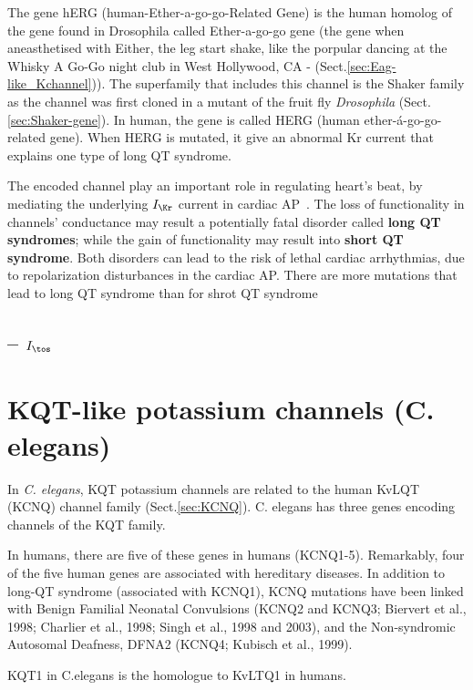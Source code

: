 The gene hERG (human-Ether-a-go-go-Related Gene) is the human homolog of the
gene found in Drosophila called Ether-a-go-go gene (the gene when aneasthetised
with Either, the leg start shake, like the porpular dancing at the Whisky A
Go-Go night club in West Hollywood, CA - (Sect.\ref{sec:Eag-like_Kchannel})).
The superfamily that includes this channel is the Shaker family as the
channel was first cloned in a mutant of the fruit fly {\it Drosophila}
(Sect.\ref{sec:Shaker-gene}). 
In human, the gene is called HERG (human ether-\'a-go-go-related gene). When
HERG is mutated, it give an abnormal Kr current that explains one type of
long QT syndrome.

The encoded channel play an important role in regulating heart's beat, by
mediating the underlying $I_\Kr$ current in cardiac
AP~\citep{mazhari2001,clancy2001,oehmen2002,fink2008}. The loss of functionality
in channels' conductance may result a potentially fatal disorder called {\bf
long QT syndromes}; while the gain of functionality may result into {\bf short
QT syndrome}. Both disorders can lead to the risk of lethal cardiac arrhythmias,
due to repolarization disturbances in the cardiac AP. There are more mutations
that lead to long QT syndrome than for shrot QT syndrome
\citep{hedley2009}

\subsection{-- $I_\tos$}
\label{sec:Itos}

\section{KQT-like potassium channels (C. elegans)}
\label{sec:KQT-like-K+-channel}

In {\it C. elegans}, KQT potassium channels are related to the human KvLQT
(KCNQ) channel family (Sect.\ref{sec:KCNQ}).  C. elegans has three genes
encoding channels of the KQT family.

In humans, there are five of these genes in humans (KCNQ1-5).
Remarkably, four of the five human genes are associated with hereditary
diseases. In addition to long-QT syndrome (associated with KCNQ1), KCNQ
mutations have been linked with Benign Familial Neonatal Convulsions (KCNQ2 and
KCNQ3; Biervert et al., 1998; Charlier et al., 1998; Singh et al., 1998 and
2003), and the Non-syndromic Autosomal Deafness, DFNA2 (KCNQ4; Kubisch et al.,
1999).

KQT1 in C.elegans is the homologue to KvLTQ1 in humans.

